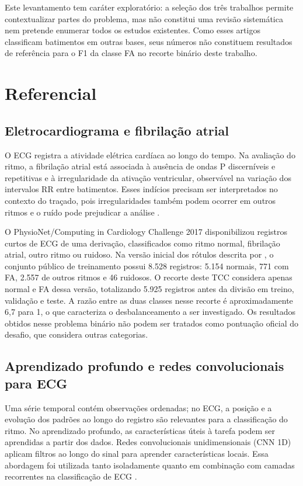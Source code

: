 \documentclass[
    12pt,                %
    openright,           %
    oneside,             %
    a4paper,             %
    english,             %
    brazil               %
]{abntex2}
\begin{document}
Este levantamento tem caráter exploratório: a seleção dos três trabalhos permite contextualizar partes do problema, mas não constitui uma revisão sistemática nem pretende enumerar todos os estudos existentes. Como esses artigos classificam batimentos em outras bases, seus números não constituem resultados de referência para o F1 da classe FA no recorte binário deste trabalho.

\section{Referencial}
\label{sec:referencial}

\subsection{Eletrocardiograma e fibrilação atrial}
\label{subsec:ecg_fa}

O ECG registra a atividade elétrica cardíaca ao longo do tempo. Na avaliação do ritmo, a fibrilação atrial está associada à ausência de ondas P discerníveis e repetitivas e à irregularidade da ativação ventricular, observável na variação dos intervalos RR entre batimentos. Esses indícios precisam ser interpretados no contexto do traçado, pois irregularidades também podem ocorrer em outros ritmos e o ruído pode prejudicar a análise \cite{VanGelder2024,Clifford2017}.

O PhysioNet/Computing in Cardiology Challenge 2017 disponibilizou registros curtos de ECG de uma derivação, classificados como ritmo normal, fibrilação atrial, outro ritmo ou ruidoso. Na versão inicial dos rótulos descrita por , o conjunto público de treinamento possui 8.528 registros: 5.154 normais, 771 com FA, 2.557 de outros ritmos e 46 ruidosos. O recorte deste TCC considera apenas normal e FA dessa versão, totalizando 5.925 registros antes da divisão em treino, validação e teste. A razão entre as duas classes nesse recorte é aproximadamente 6,7 para 1, o que caracteriza o desbalanceamento a ser investigado. Os resultados obtidos nesse problema binário não podem ser tratados como pontuação oficial do desafio, que considera outras categorias.

\subsection{Aprendizado profundo e redes convolucionais para ECG}
\label{subsec:cnn_ecg}

Uma série temporal contém observações ordenadas; no ECG, a posição e a evolução dos padrões ao longo do registro são relevantes para a classificação do ritmo. No aprendizado profundo, as características úteis à tarefa podem ser aprendidas a partir dos dados. Redes convolucionais unidimensionais (CNN 1D) aplicam filtros ao longo do sinal para aprender características locais. Essa abordagem foi utilizada tanto isoladamente quanto em combinação com camadas recorrentes na classificação de ECG \cite{Goodfellow2016,Zihlmann2017,Xiong2018}.
\end{document}
